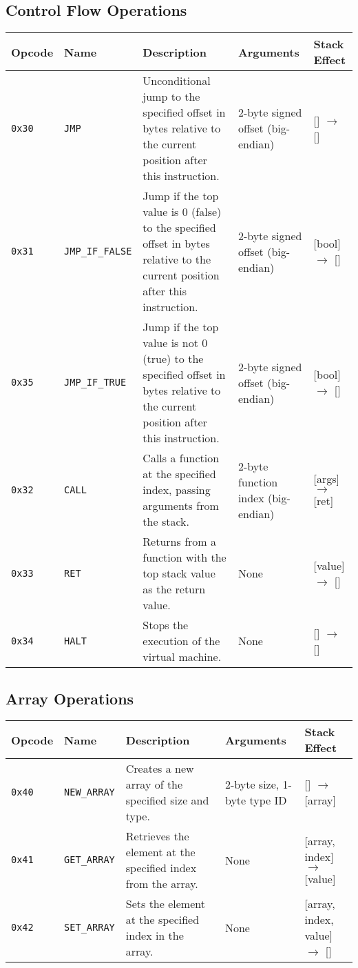 \documentclass[a4paper,12pt]{article}
\begin{document}
    \subsection{Control Flow Operations}
    \begin{tabular}{|l|l|p{4cm}|l|l|}
        \hline
        \textbf{Opcode} & \textbf{Name} & \textbf{Description} & \textbf{Arguments} & \textbf{Stack Effect} \\ \hline
        \texttt{0x30} & \texttt{JMP} & Unconditional jump to the specified offset in bytes relative to the current position after this instruction. & 2-byte signed offset (big-endian) & [] $\rightarrow$ [] \\ \hline
        \texttt{0x31} & \texttt{JMP\_IF\_FALSE} & Jump if the top value is 0 (false) to the specified offset in bytes relative to the current position after this instruction. & 2-byte signed offset (big-endian) & [bool] $\rightarrow$ [] \\ \hline
        \texttt{0x35} & \texttt{JMP\_IF\_TRUE} & Jump if the top value is not 0 (true) to the specified offset in bytes relative to the current position after this instruction. & 2-byte signed offset (big-endian) & [bool] $\rightarrow$ [] \\ \hline
        \texttt{0x32} & \texttt{CALL} & Calls a function at the specified index, passing arguments from the stack. & 2-byte function index (big-endian) & [args] $\rightarrow$ [ret] \\ \hline
        \texttt{0x33} & \texttt{RET} & Returns from a function with the top stack value as the return value. & None & [value] $\rightarrow$ [] \\ \hline
        \texttt{0x34} & \texttt{HALT} & Stops the execution of the virtual machine. & None & [] $\rightarrow$ [] \\ \hline
    \end{tabular}
    \label{tab:control_flow_operations}

    \subsection{Array Operations}
    \begin{tabular}{|l|l|p{2.5cm}|l|l|}
        \hline
        \textbf{Opcode} & \textbf{Name} & \textbf{Description} & \textbf{Arguments} & \textbf{Stack Effect} \\ \hline
        \texttt{0x40} & \texttt{NEW\_ARRAY} & Creates a new array of the specified size and type. & 2-byte size, 1-byte type ID & [] $\rightarrow$ [array] \\ \hline
        \texttt{0x41} & \texttt{GET\_ARRAY} & Retrieves the element at the specified index from the array. & None & [array, index] $\rightarrow$ [value] \\ \hline
        \texttt{0x42} & \texttt{SET\_ARRAY} & Sets the element at the specified index in the array. & None & [array, index, value] $\rightarrow$ [] \\ \hline
    \end{tabular}
    \label{tab:array_operations}
\end{document}
